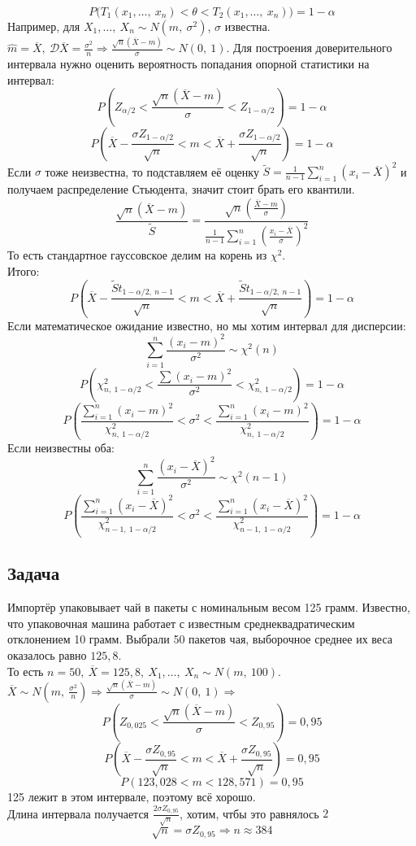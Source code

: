 \documentclass[12pt, a4paper]{article}
\newcommand{\dev}{\mathcal{D}}
\begin{document}
\[P\big(T_1(x_1,\dots,\ x_n) < \theta < T_2(x_1,\dots,\ x_n)\big) = 1 - \alpha\]
Например, для $X_1,\dots,\ X_n \sim N(m,\ \sigma^2)$, $\sigma$ известна.\\
$\hat m = \overline{X},\ \dev \overline{X} = \frac{\sigma^2}{n}\Rightarrow \frac{\sqrt{n}(\overline{X} - m)}{\sigma} \sim N(0,\ 1)$. Для построения доверительного интервала нужно оценить вероятность попадания опорной статистики на интервал:
\[P\left( Z_{\alpha/2} < \frac{\sqrt{n} (\overline{X} - m)}{\sigma} < Z_{1 - \alpha/2} \right) = 1 - \alpha\]
\[P\left( \overline{X} - \frac{\sigma Z_{1 - \alpha/2}}{\sqrt{n}} < m < \overline{X} + \frac{\sigma Z_{1 - \alpha/2}}{\sqrt{n}} \right) = 1 - \alpha\]
Если $\sigma$ тоже неизвестна, то подставляем её оценку $\tilde S = \frac{1}{n - 1} \sum\limits_{i = 1}^{n} (x_i - \overline{X})^2$ и получаем распределение Стьюдента, значит стоит брать его квантили.
\[\frac{\sqrt{n} (\overline{X} - m)}{\tilde S} = \frac{\sqrt{n} (\frac{\overline{X} - m}{\sigma})}{\frac{1}{n - 1} \sum_{i = 1}^{n} \left( \frac{x_i - \overline{X}}{\sigma} \right)^2}\]
То есть стандартное гауссовское делим на корень из $\chi^2$.\\
Итого:
\[P\left( \overline{X} - \frac{\tilde S t_{1 - \alpha/2,\ n - 1}}{\sqrt{n}} < m < \overline{X} + \frac{\tilde S t_{1 - \alpha/2,\ n - 1}}{\sqrt{n}} \right) = 1 - \alpha\]
Если математическое ожидание известно, но мы хотим интервал для дисперсии:
\[\sum_{i = 1}^{n} \frac{(x_i - m)^2}{\sigma^2} \sim \chi^2(n)\]
\[P\left( \chi^2_{n,\ 1 - \alpha/2} < \frac{\sum(x_i - m)^2}{\sigma^2} < \chi^2_{n,\ 1 - \alpha/2} \right) = 1 - \alpha\]
\[P\left(\frac{\sum_{i = 1}^{n} (x_i - m)^2}{\chi^2_{n,\ 1 - \alpha/2}} < \sigma^2 < \frac{\sum_{i = 1}^{n} (x_i - m)^2}{\chi^2_{n,\ 1 - \alpha/2}} \right) = 1 - \alpha\]
Если неизвестны оба:
\[\sum_{i = 1}^{n} \frac{(x_i - \overline{X})^2}{\sigma^2} \sim \chi^2(n - 1)\]
\[P\left(\frac{\sum_{i = 1}^{n} (x_i - \overline{X})^2}{\chi^2_{n - 1,\ 1 - \alpha/2}} < \sigma^2 < \frac{\sum_{i = 1}^{n} (x_i - \overline{X})^2}{\chi^2_{n - 1,\ 1 - \alpha/2}} \right) = 1 - \alpha\]
\subsection*{Задача}
Импортёр упаковывает чай в пакеты с номинальным весом 125 грамм. Известно, что упаковочная машина работает с известным среднеквадратическим отклонением 10 грамм. Выбрали 50 пакетов чая, выборочное среднее их веса оказалось равно $125,8$.\\
То есть $n = 50,\ \overline{X} = 125,8,\ X_1,\dots,\ X_n \sim N(m,\ 100)$.\\
$\overline{X} \sim N\left(m,\ \frac{\sigma^2}{n}\right)\Rightarrow \frac{\sqrt{n} (\overline{X} - m)}{\sigma} \sim N(0,\ 1)\Rightarrow$
\[P\left( Z_{0,025} < \frac{\sqrt{n}(\overline{X} - m)}{\sigma} < Z_{0,95} \right) = 0,95\]
\[P\left( \overline{X} - \frac{\sigma Z_{0,95}}{\sqrt{n}} < m < \overline{X} + \frac{\sigma Z_{0,95}}{\sqrt{n}} \right) = 0,95\]
\[P(123,028 < m < 128,571) = 0,95\]
125 лежит в этом интервале, поэтому всё хорошо.\\
Длина интервала получается $\frac{2\sigma Z_{0,95}}{\sqrt{n}}$, хотим, чтбы это равнялось $2$
\[\sqrt{n} = \sigma Z_{0,95} \Rightarrow n \approx 384\]
\end{document}
